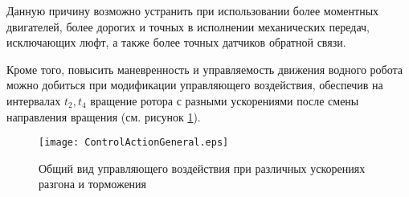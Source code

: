 
Данную причину возможно устранить при использовании более моментных двигателей, более дорогих и точных в исполнении механических передач, исключающих люфт, а также более точных датчиков обратной связи.

Кроме того, повысить маневренность и управляемость движения водного робота можно добиться при модификации управляющего воздействия, обеспечив на интервалах $t_2,t_4 $ вращение ротора с разными ускорениями после смены направления вращения (см. рисунок \ref{gen_cont_ac}).    

\begin{figure}[!ht]
	\centering
	\texttt{[image: ControlActionGeneral.eps]}
	\caption{Общий вид управляющего воздействия при различных ускорениях разгона и торможения}
	\label{gen_cont_ac}
\end{figure}



\clearpage